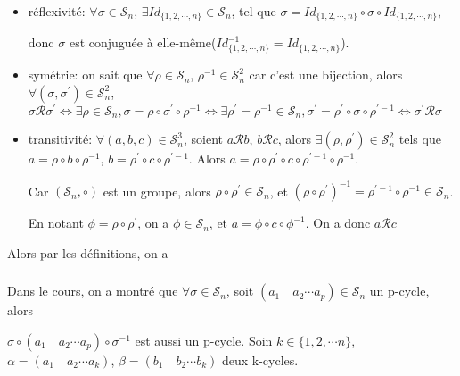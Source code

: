 \documentclass[a4paper,12pt]{book}
\begin{document}
\subsubsection{}
\begin{itemize}
    \item réflexivité: $\forall \sigma \in \mathscr{S}_n$, $\exists Id_{\{1,2,\cdots,n\}}\in \mathscr{S}_n$, tel que 
    $\sigma=Id_{\{1,2,\cdots,n\}}\circ \sigma \circ Id_{\{1,2,\cdots,n\}}$, 
    
    donc $\sigma$ est conjuguée à elle-même($Id_{\{1,2,\cdots,n\}}^{-1}=Id_{\{1,2,\cdots,n\}}$). 
    \item symétrie: on sait que $\forall \rho \in \mathscr{S}_n$, $\rho^{-1} \in \mathscr{S}_n^2$ car c'est une bijection, alors  
    $\forall (\sigma,\sigma^{'}) \in \mathscr{S}_n^2$, $\sigma \mathcal{R}\sigma^{'} \Longleftrightarrow \exists \rho \in \mathscr{S}_n, \sigma=\rho\circ \sigma^{'}\circ \rho^{-1}
    \Longleftrightarrow \exists \rho^{'}=\rho^{-1}\in \mathscr{S}_n, \sigma^{'}=\rho^{'}\circ \sigma \circ \rho^{'-1} \Longleftrightarrow \sigma^{'}\mathcal{R}\sigma$
    \item transitivité: $\forall (a,b,c) \in \mathscr{S}_n^3$, soient $a \mathcal{R} b$, $b \mathcal{R} c$, alors 
    $\exists (\rho,\rho^{'}) \in \mathscr{S}_n^2$ tels que $a=\rho\circ b\circ \rho^{-1}$, $b=\rho^{'}\circ c\circ \rho^{'-1}$. 
    Alors $a=\rho\circ\rho^{'}\circ c\circ\rho^{'-1} \circ\rho^{-1}$. 
    
    Car $(\mathscr{S}_n,\circ)$ est un groupe, alors $\rho\circ \rho^{'} \in \mathscr{S}_n$, 
    et $(\rho\circ \rho^{'})^{-1}=\rho^{'-1}\circ \rho ^{-1} \in \mathscr{S}_n$. 
    
    En notant $\phi=\rho\circ \rho^{'}$, on a $\phi \in \mathscr{S}_n$, et $a=\phi\circ c \circ \phi^{-1}$. 
    On a donc $a\mathcal{R}c$

\end{itemize}
Alors par les définitions, on a 
\subsubsection{}
Dans le cours, on a montré que $\forall \sigma \in \mathscr{S}_n$, soit $(a_1\quad a_2\cdots a_p)\in \mathscr{S}_n$ un p-cycle, 
alors 

$\sigma\circ (a_1\quad a_2\cdots a_p) \circ\sigma^{-1}$ est aussi un p-cycle. 
Soin $k \in \{1,2,\cdots n\}$, $\alpha=(a_1\quad a_2\cdots a_k)$, $\beta=(b_1\quad b_2\cdots b_k)$ deux k-cycles. 
\end{document}

